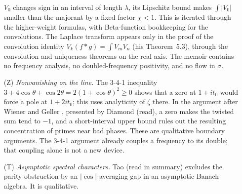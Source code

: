 \documentclass[11pt,letterpaper]{article}
\numberwithin{equation}{section}
\theoremstyle{definition}
\theoremstyle{remark}
\begin{document}
\begin{enumerate}
       $V_0$ changes sign in an interval of length $\lambda$, its Lipschitz
       bound makes $\int|V_0|$ smaller than the majorant by a fixed factor
       $\chi<1$. This is iterated through the higher-weight formulas, with
       Beta-function bookkeeping for the convolutions. The Laplace transform
       appears only in the proof of the convolution identity
       $V_k(f*g)=\int V_mV_n$ (his Theorem~5.3), through the convolution and
       uniqueness theorems on the real axis. The memoir contains no
       frequency analysis, no doubled-frequency positivity, and no flow in
       $\sigma$.
 \item[(Z)] \emph{Nonvanishing on the line.} The 3-4-1 inequality
       $3+4\cos\theta+\cos2\theta=2(1+\cos\theta)^2\ge0$ shows that a zero
       at $1+it_0$ would force a pole at $1+2it_0$; this uses analyticity
       of $\zeta$ there. In the argument after Wiener and Geller
       \cite{wiener-geller}, presented by Diamond
       \cite[Section~7]{diamond-survey} (read), a zero makes the twisted sum
       tend to $-1$, and a short-interval upper bound rules out the
       resulting concentration of primes near bad phases. These are
       qualitative boundary arguments. The 3-4-1 argument already couples
       a frequency to its double; that coupling alone is not a new device.
 \item[(T)] \emph{Asymptotic spectral characters.} Tao \cite{tao} (read in
       summary) excludes the parity obstruction by an $|\cos|$-averaging
       gap in an asymptotic Banach algebra. It is qualitative.
\end{enumerate}
\end{document}
